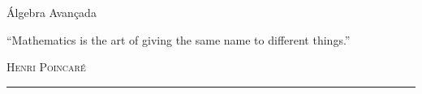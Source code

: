 \begin{titlepage}
\vspace*{2cm}

\noindent
\vspace*{0.5cm}
  \titlefont \hspace{-2cm}Álgebra Avançada \vspace{-0.32cm}\par
\vspace{1cm}
\epigraph{``Mathematics is the art of giving the same name to different things.''}
{ \textsc{Henri Poincaré}}
\null\vfill
\vspace*{1cm}
\noindent
\hfill
\begin{minipage}{0.45\linewidth}
    \begin{flushright}
        \printauthor
    \end{flushright}
\end{minipage}
%
\begin{minipage}{0.02\linewidth}
    \rule{1pt}{120pt}
\end{minipage}
\titlepagedecoration
\end{titlepage}

